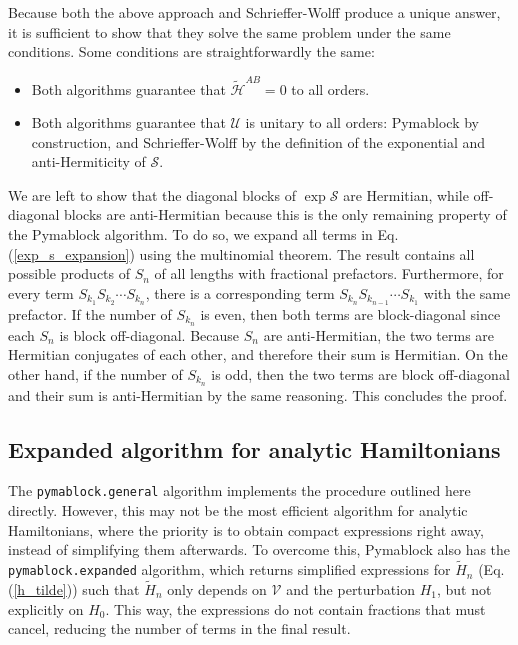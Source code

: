Because both the above approach and Schrieffer-Wolff produce a unique answer, it
is sufficient to show that they solve the same problem under the same
conditions.
Some conditions are straightforwardly the same:

\begin{itemize}
\item Both algorithms guarantee that $\tilde{\mathcal{H}}^{AB} = 0$ to all orders.
\item Both algorithms guarantee that $\mathcal{U}$ is unitary to all orders:
Pymablock by construction, and Schrieffer-Wolff by the
definition of the exponential and anti-Hermiticity of $\mathcal{S}$.
\end{itemize}

We are left to show that the diagonal blocks of $\exp \mathcal{S}$ are
Hermitian, while off-diagonal blocks are anti-Hermitian because this is the
only remaining property of the Pymablock algorithm.
To do so, we expand all terms in Eq. (\ref{exp_s_expansion}) using the multinomial theorem.
The result contains all possible products of $S_n$ of all lengths with fractional prefactors.
Furthermore, for every term $S_{k_1}S_{k_2}\cdots S_{k_n}$, there is a
corresponding term $S_{k_n}S_{k_{n -1}}\cdots S_{k_1}$ with the same prefactor.
If the number of $S_{k_n}$ is even, then both terms are block-diagonal since
each $S_n$ is block off-diagonal.
Because $S_n$ are anti-Hermitian, the two terms are Hermitian conjugates of each
other, and therefore their sum is Hermitian.
On the other hand, if the number of $S_{k_n}$ is odd, then the two terms are
block off-diagonal and their sum is anti-Hermitian by the same reasoning.
This concludes the proof.

\subsection{Expanded algorithm for analytic Hamiltonians}

The \texttt{pymablock.general} algorithm implements the procedure outlined here directly.
However, this may not be the most efficient algorithm for analytic Hamiltonians,
where the priority is to obtain compact expressions right away, instead of
simplifying them afterwards.
To overcome this, Pymablock also has the \texttt{pymablock.expanded} algorithm, which
returns simplified expressions for $\tilde{H}_{n}$ (Eq. (\ref{h_tilde})) such
that $\tilde{H}_{n}$ only depends on $\mathcal{V}$ and the perturbation $H_1$, but not
explicitly on $H_0$.
This way, the expressions do not contain fractions that must cancel, reducing
the number of terms in the final result.

